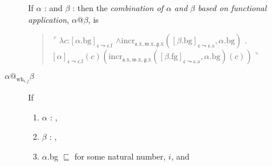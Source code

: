 \begin{description}
  If $\alpha$ :  
and $\beta$ : 
                         then the \textit{combination of $\alpha$ and
    $\beta$  based on functional application}, $\alpha\text{@}\beta$, is
  \begin{quote}
   $\ulcorner\lambda c$:$[\alpha.\text{bg}]_{\mathfrak{c}\leadsto\mathfrak{c}.\text{f}}$
      \d{$\wedge$}$\mathrm{incr}_{\mathfrak{s}.\text{x},\mathfrak{w}.\text{x},\mathfrak{g}.\text{x}}([\beta.\text{bg}]_{\mathfrak{c}\leadsto\mathfrak{c}.\text{a}},\alpha.\text{bg})$
      . \\
      \hspace*{2em}$[\alpha]_{\mathfrak{c}\leadsto\mathfrak{c}.\text{f}}(c)(\mathrm{incr}_{\mathfrak{s}.\text{x},\mathfrak{w}.\text{x},\mathfrak{g}.\text{x}}([\beta.\text{fg}]_{\mathfrak{c}\leadsto\mathfrak{c}.\text{a}},\alpha.\text{bg})(c))\urcorner$

      
    \end{quote}

      \item[\textnormal{$\alpha\text{@}_{\mathrm{wh}_{i,j}}\beta$}]
    \mbox{}

      If
  \begin{enumerate}
  \item $\alpha$ : ,
    
  \item $\beta$ : ,
    
  \item $\alpha$.bg $\sqsubseteq$  for some natural number,
    $i$, and
    

\end{enumerate}
\end{description}
